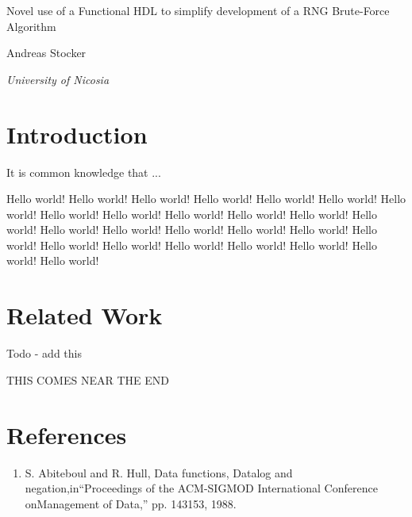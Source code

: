 \documentclass{article}
\begin{document}
    \begin{center}
    \end{center}
    
    \addvspace{20mm}
        
    \begin{center}
        \huge Novel use of a Functional HDL to simplify development of a RNG Brute-Force Algorithm
    \end{center}
    
    \begin{center}
    \end{center}
       
    \begin{center}
        \large Andreas Stocker
    \end{center}
    
    \begin{center}
        \small \emph {University of Nicosia}
    \end{center}

    \addvspace{15mm}

    \begin{multicols}{2}


    \section{Introduction}
It is common knowledge that ...

Hello world!
Hello world!
Hello world!
Hello world!
Hello world!
Hello world!
Hello world!
Hello world!
Hello world!
Hello world!
Hello world!
Hello world!
Hello world!
Hello world!
Hello world!
Hello world!
Hello world!
Hello world!
Hello world!
Hello world!
Hello world!
Hello world!
Hello world!
Hello world!
Hello world!
Hello world!
    
    \section{Related Work}

    Todo - add this

    THIS COMES NEAR THE END

    
    \end{multicols}

    \break
    \section*{References}

    \begin{enumerate}

    \item S.  Abiteboul  and  R.  Hull,  Data  functions,  Datalog  and  negation,in``Proceedings  of  the  ACM-SIGMOD  International  Conference  onManagement of Data,'' pp. 143153, 1988.

    \end{enumerate}
    
\end{document}
